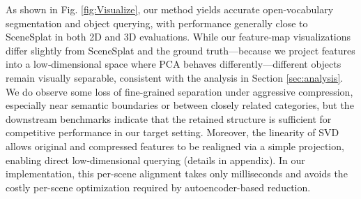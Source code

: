\documentclass{article}
\begin{document}
As shown in Fig. \ref{fig:Visualize}, our method yields accurate open-vocabulary segmentation and object querying, with performance generally close to SceneSplat in both 2D and 3D evaluations. While our feature‑map visualizations differ slightly from SceneSplat and the ground truth—because we project features into a low‑dimensional space where PCA behaves differently—different objects remain visually separable, consistent with the analysis in Section \ref{sec:analysis}. We do observe some loss of fine-grained separation under aggressive compression, especially near semantic boundaries or between closely related categories, but the downstream benchmarks indicate that the retained structure is sufficient for competitive performance in our target setting. Moreover, the linearity of SVD allows original and compressed features to be realigned via a simple projection, enabling direct low‑dimensional querying (details in appendix). In our implementation, this per-scene alignment takes only milliseconds and avoids the costly per-scene optimization required by autoencoder-based reduction.
\end{document}
